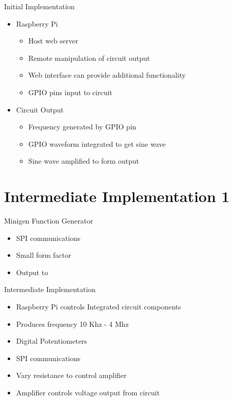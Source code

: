 \begin{frame}{Initial Implementation}
  \begin{block}{}
  \begin{itemize}
    \item Raspberry Pi 
      \begin{itemize}
        \item Host web server
        \item Remote manipulation of circuit output
        \item Web interface can provide additional functionality
        \item GPIO pins input to circuit
      \end{itemize}
    \item Circuit Output
      \begin{itemize}
        \item Frequency generated by GPIO pin 
        \item GPIO waveform integrated to get sine wave
        \item Sine wave amplified to form output
      \end{itemize}
    \end{itemize}
  \end{block}

\end{frame}

\section{Intermediate Implementation 1}

\begin{frame}{Minigen Function Generator}
  \begin{itemize}
    \item SPI communications
    \item Small form factor
    \item Output to 
  \end{itemize}
\end{frame}

\begin{frame}{Intermediate Implementation}
  \begin{itemize}
    \item Raspberry Pi controls Integrated circuit components
    \item Produces frequency 10 Khz - 4 Mhz
    \item Digital Potentiometers
    \item SPI communications
    \item Vary resistance to control amplifier
    \item Amplifier controls voltage output from circuit
  \end{itemize}
\end{frame}

